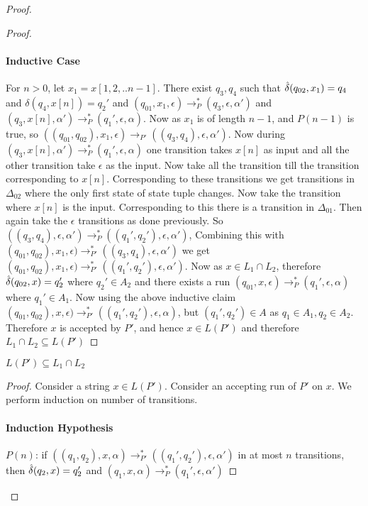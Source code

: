 \begin{soln}
\begin{proof}
\begin{proof}
\paragraph{Inductive Case} For $n>0$, let $x_1=x[1,2,..n-1]$. There exist $q_3,q_4$ such that $\hat{\delta}(q_{02},x_1)=q_4$ and $\delta(q_4,x[n])=q_2'$ and $(q_{01},x_1,\epsilon) \to_{P}^*
(q_3,\epsilon,\alpha')$ and $(q_3,x[n],\alpha') \to_{P}^* (q_1',\epsilon,\alpha)$. Now as $x_1$ is of length $n-1$, and $P(n-1)$ is true, so $((q_{01},q_{02}),x_1,\epsilon) \to_{P'}
((q_3,q_4),\epsilon,\alpha')$.\nl
Now during $(q_3,x[n],\alpha') \to_{P}^* (q_1',\epsilon,\alpha)$ one transition takes $x[n]$ as input and all the other transition take $\epsilon$ as the input. Now take all the transition till the
transition corresponding to $x[n]$. Corresponding to these transitions we get transitions in $\Delta_{02}$ where the only first state of state tuple changes. Now take the transition where $x[n]$ is
the input. Corresponding to this there is a transition in $\Delta_{01}$. Then again take the $\epsilon$ transitions as done previously.\nl
So $((q_3,q_4),\epsilon,\alpha') \to_{P}^* ((q_1',q_2'),\epsilon,\alpha')$, Combining this with $(q_{01},q_{02}),x_1,\epsilon) \to_{P'}^* ((q_3,q_4),\epsilon,\alpha')$ we get 
 $(q_{01},q_{02}),x_1,\epsilon) \to_{P'}^* ((q_1',q_2'),\epsilon,\alpha')$.\nl
Now as $x \in L_1 \cap L_2$, therefore  $\hat{\delta}(q_{02},x)=q_2'$ where $q_2' \in A_2$ and there exists a run $(q_{01},x,\epsilon) \to_{P}^* (q_1',\epsilon,\alpha)$ where $q_1' \in A_1$. 
Now using the above inductive claim $(q_{01},q_{02}),x,\epsilon) \to_{P'}^* ((q_1',q_2'),\epsilon,\alpha)$, but $(q_1',q_2') \in A$ as $q_1 \in A_1, q_2 \in A_2$. Therefore $x$ is accepted by
$P'$, and hence $x \in L(P')$ and therefore $L_1 \cap L_2 \subseteq L(P')$

\end{proof}

\begin{claim}
$L(P') \subseteq L_1 \cap L_2$
\end{claim}
\begin{proof}
Consider a string $x \in L(P')$. Consider an accepting run of $P'$ on $x$. We perform induction on number of transitions.
\paragraph{Induction Hypothesis}
$P(n)$: if $((q_1,q_2),x,\alpha) \to_{P'}^* ((q_1',q_2'),\epsilon,\alpha')$ in at most $n$ transitions, then $\hat{\delta}(q_2,x)=q_2'$ and $( q_{1},x,\alpha) \to_{P}^* (q_1',\epsilon,\alpha')$

\end{proof}
\end{proof}
\end{soln}
